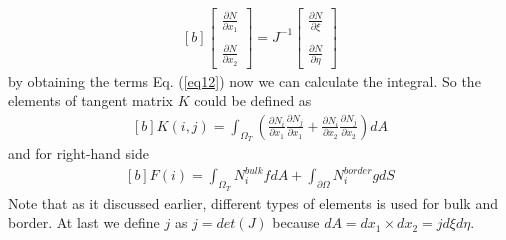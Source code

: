 \documentclass[]{article}
\begin{document}
\begin{equation}\label{eq17}
	\begin{aligned}[b]
\begin{bmatrix}
	\frac{\partial N}{\partial x_{1}}\\
	\\
	\frac{\partial N}{\partial x_{2}}  
\end{bmatrix}
= J^{-1}
\begin{bmatrix}
	\frac{\partial N}{\partial \xi}\\
	\\
	\frac{\partial N}{\partial \eta}
\end{bmatrix}
	\end{aligned}
\end{equation}
 by obtaining the terms Eq. (\ref{eq12}) now we can calculate the integral. So the elements of tangent matrix $K$ could be defined as
\begin{equation}\label{eq18}
	\begin{aligned}[b]
		K(i,j) = \int_{\Omega_{T}} (\frac{\partial N_{i}}{\partial x_{1}}
		\frac{\partial N_{j}}{\partial x_{1}}+\frac{\partial N_{i}}{\partial x_{2}} 
		\frac{\partial N_{j}}{\partial x_{2}}) dA
	\end{aligned}
\end{equation}
and for right-hand side
\begin{equation}\label{eq19}
	\begin{aligned}[b]
		F(i) = \int_{\Omega_{T}} N^{bulk}_{i}f dA + \int_{\partial \Omega} N^{border}_i g dS
	\end{aligned}
\end{equation}
Note that as it discussed earlier, different types of elements is used for bulk and border. At last we define $j$ as $j=det(J)$ because $dA=dx_{1} \times dx_{2}=jd\xi d\eta$.
\end{document}
